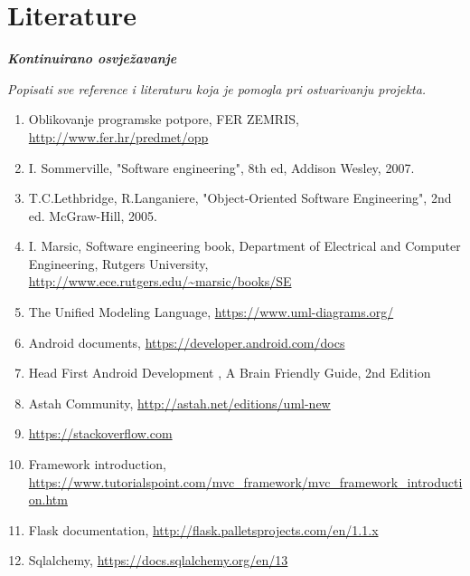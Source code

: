 \chapter*{Literature}
	 	
 		\textbf{\textit{Kontinuirano osvježavanje}}
	
		\textit{Popisati sve reference i literaturu koja je pomogla pri ostvarivanju projekta.}
		
		
		\begin{enumerate}
			
			
			\item  Oblikovanje programske potpore, FER ZEMRIS, \url{http://www.fer.hr/predmet/opp}
			
			\item  I. Sommerville, "Software engineering", 8th ed, Addison Wesley, 2007.
			
			\item  T.C.Lethbridge, R.Langaniere, "Object-Oriented Software Engineering", 2nd ed. McGraw-Hill, 2005.
			
			\item  I. Marsic, Software engineering book, Department of Electrical and Computer Engineering, Rutgers University, \url{http://www.ece.rutgers.edu/~marsic/books/SE}
			
			\item  The Unified Modeling Language, \url{https://www.uml-diagrams.org/}
			
			\item  Android documents, \url{https://developer.android.com/docs}
			
			\item Head First Android Development , A Brain Friendly Guide, 2nd Edition

			\item  Astah Community, \url{http://astah.net/editions/uml-new}

			\item \url{https://stackoverflow.com}

			\item Framework introduction, \url{https://www.tutorialspoint.com/mvc_framework/mvc_framework_introduction.htm}

			\item Flask documentation, \url{http://flask.palletsprojects.com/en/1.1.x}

			\item Sqlalchemy, \url{https://docs.sqlalchemy.org/en/13}

		\end{enumerate}

		
		 